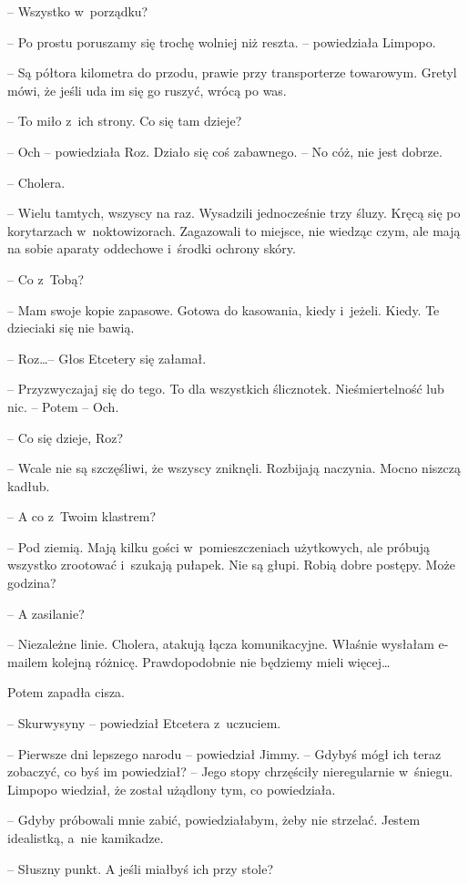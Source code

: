 \documentclass[oneside,polish,11pt,sfheadings]{mwbk}
\begin{document}
-- Wszystko w~porządku?

-- Po prostu poruszamy się trochę wolniej niż reszta. -- powiedziała
Limpopo.

-- Są półtora kilometra do przodu, prawie przy transporterze towarowym.
Gretyl mówi, że jeśli uda im się go ruszyć, wrócą po was.

-- To miło z~ich strony. Co się tam dzieje?

-- Och -- powiedziała Roz. Działo się coś zabawnego. -- No cóż, nie jest
dobrze.

-- Cholera.

-- Wielu tamtych, wszyscy na raz. Wysadzili jednocześnie trzy śluzy.
Kręcą się po korytarzach w~noktowizorach. Zagazowali to miejsce, nie
wiedząc czym, ale mają na sobie aparaty oddechowe i~środki ochrony
skóry.

-- Co z~Tobą?

-- Mam swoje kopie zapasowe. Gotowa do kasowania, kiedy i~jeżeli. Kiedy.
Te dzieciaki się nie bawią.

-- Roz\ldots  -- Głos Etcetery się załamał.

-- Przyzwyczajaj się do tego. To dla wszystkich ślicznotek.
Nieśmiertelność lub nic. -- Potem -- Och.

-- Co się dzieje, Roz?

-- Wcale nie są szczęśliwi, że wszyscy zniknęli. Rozbijają naczynia.
Mocno niszczą kadłub.

-- A co z~Twoim klastrem?

-- Pod ziemią. Mają kilku gości w~pomieszczeniach użytkowych, ale próbują
wszystko zrootować i~szukają pułapek. Nie są głupi. Robią dobre postępy.
Może godzina?

-- A zasilanie?

-- Niezależne linie. Cholera, atakują łącza komunikacyjne. Właśnie
wysłałam e-mailem kolejną różnicę. Prawdopodobnie nie będziemy mieli
więcej\ldots 

Potem zapadła cisza.

-- Skurwysyny -- powiedział Etcetera z~uczuciem.

-- Pierwsze dni lepszego narodu -- powiedział Jimmy. -- Gdybyś mógł ich
teraz zobaczyć, co byś im powiedział? -- Jego stopy chrzęściły
nieregularnie w~śniegu. Limpopo wiedział, że został użądlony tym, co
powiedziała.

-- Gdyby próbowali mnie zabić, powiedziałabym, żeby nie strzelać. Jestem
idealistką, a~nie kamikadze.

-- Słuszny punkt. A jeśli miałbyś ich przy stole?
\end{document}
